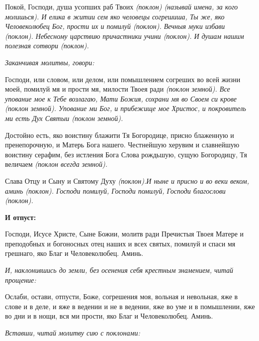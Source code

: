 Покой, Господи, душа усопших раб Твоих \itshape (поклон) (называй имена, за кого молишься)\normalfont{}. И елика в житии сем яко человецы согрешиша, Ты же, яко Человеколюбец Бог, прости их и помилуй (поклон). Вечныя муки избави \itshape (поклон)\normalfont{}. Небесному царствию причастники учини \itshape (поклон)\normalfont{}. И душам нашим полезная сотвори \itshape (поклон)\normalfont{}.


\medskip


\itshape Заканчивая молитвы, говори: \normalfont{}


Господи, или словом, или делом, или помышлением согреших во всей жизни моей, помилуй мя и прости мя, милости Твоея ради \itshape (поклон земной)\normalfont{}. Все упование мое к Тебе возлагаю, Мати Божия, сохрани мя во Своем си крове \itshape (поклон земной)\normalfont{}. Упование ми Бог, и прибежище мое Христос, и покровитель ми есть Дух Святыи \itshape (поклон земной)\normalfont{}.


Достойно есть, яко воистину блажити Тя Богородице, присно блаженную и пренепорочную, и Матерь Бога нашего. Честнейшую херувим и славнейшую воистину серафим, без истления Бога Слова рождьшую, сущую Богородицу, Тя величаем \itshape (поклон всегда земной)\normalfont{}.


Слава Отцу и Сыну и Святому Духу \itshape (поклон)\normalfont{}.И ныне и присно и во веки веком, аминь \itshape (поклон)\normalfont{}. Господи помилуй, Господи помилуй, Господи благослови \itshape (поклон)\normalfont{}. 


\medskip


\bfseries И отпуст:\normalfont{}\nopagebreak


Господи, Исусе Христе, Сыне Божии, молитв ради Пречистыя Твоея Матере и преподобных и богоносных отец наших и всех святых, помилуй и спаси мя грешнаго, яко Благ и Человеколюбец. Аминь.


\medskip


\itshape И, наклонившись до земли, без осенения себя крестным знамением, читай прощение: \normalfont{}


Ослаби, остави, отпусти, Боже, согрешения моя, вольная и невольная, яже в слове и в деле, и яже в ведении и не в ведении, яже во уме и в помышлении, яже во дни и в нощи, вся ми прости, яко Благ и Человеколюбец. Аминь. 


\medskip


\itshape Вставши, читай молитву сию с поклонами:\normalfont{}


